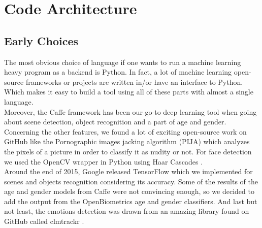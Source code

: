 \documentclass{article}
\begin{document}
\newpage
\section{Code Architecture}
    \subsection{Early Choices}
        The most obvious choice of language if one wants to run a machine learning heavy program as a backend is Python. In fact, a lot of machine learning open-source frameworks or projects are written in/or have an interface to Python. Which makes it easy to build a tool using all of these parts with almost a single language.
        \\Moreover, the Caffe framework \cite{caffe} has been our go-to deep learning tool when going about scene detection, object recognition and a part of age and gender.
        Concerning the other features, we found a lot of exciting open-source work on GitHub like the Pornographic images jacking algorithm (PIJA) \cite{pija} which analyzes the pixels of a picture in order to classify it as nudity or not. For face detection we used the OpenCV wrapper in Python using Haar Cascades \cite{haar}.
        \\Around the end of 2015, Google released TensorFlow \cite{tensor} which we implemented for scenes and objects recognition considering its accuracy.
        Some of the results of the age and gender models from Caffe were not convincing enough, so we decided to add the output from the OpenBiometrics \cite{openbr} age and gender classifiers.
        And last but not least, the emotions detection was drawn from an amazing library found on GitHub called clmtrackr \cite{clm}.
    \newpage
\end{document}
